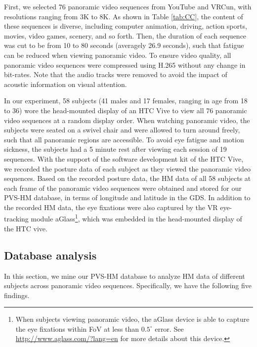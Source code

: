 \documentclass[10pt,journal,compsoc]{IEEEtran}
\begin{document}
First, we selected 76 panoramic video sequences from YouTube and VRCun, with resolutions ranging from 3K to 8K.
As shown in Table \ref{tab:CC}, the content of these sequences is diverse, including computer animation, driving, action sports, movies, video games, scenery, and so forth.
Then, the duration of each sequence was cut to be from 10 to 80 seconds (averagely 26.9 seconds), such that fatigue can be reduced when viewing panoramic video.
To ensure video quality, all panoramic video sequences were compressed using H.265 \cite{Sullivan2013Overview} without any change in bit-rates.
Note that the audio tracks were removed to avoid the impact of acoustic information on visual attention.

In our experiment, 58 subjects (41 males and 17 females, ranging in age from 18 to 36) wore the head-mounted display of an HTC Vive to view all 76 panoramic video sequences at a random display order.
When watching panoramic video, the subjects were seated on a swivel chair and were allowed to turn around freely, such that all panoramic regions are accessible.
To avoid eye fatigue and motion sickness, the subjects had a 5 minute rest after viewing each session of 19 sequences.
With the support of the software development kit of the HTC Vive, we recorded the posture data of each subject as they viewed the panoramic video sequences.
Based on the recorded posture data, the HM data of all 58 subjects at each frame of the panoramic video sequences were obtained and stored for our PVS-HM database, in terms of longitude and latitude in the GDS.
In addition to the recorded HM data, the eye fixations were also captured by the VR eye-tracking module aGlass\footnote{When subjects viewing panoramic video, the aGlass device is able to capture the eye fixations within FoV at less than $0.5^{\circ}$ error. See \url{http://www.aglass.com/?lang=en} for more details about this device.}, which was embedded in the head-mounted display of the HTC vive.

\subsection{Database analysis}
\label{Database_analysis}

In this section, we mine our PVS-HM database to analyze HM data of different subjects across panoramic video sequences.
Specifically, we have the following five findings.
\end{document}
